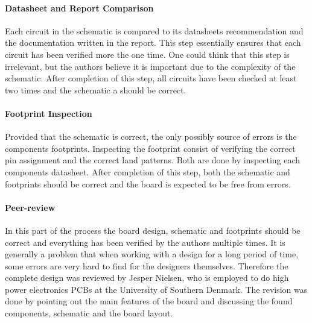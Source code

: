 \paragraph{Datasheet and Report Comparison}
Each circuit in the schematic is compared to its datasheets recommendation and the documentation written in the report. 
This step essentially ensures that each circuit has been verified more the one time. 
One could think that this step is irrelevant, but the authors believe it is important due to the complexity of the schematic.
After completion of this step, all circuits have been checked at least two times and the schematic a should be correct. 

\paragraph{Footprint Inspection}
Provided that the schematic is correct, the only possibly source of errors is the components footprints. 
Inspecting the footprint consist of verifying the correct pin assignment and the correct land patterns.
Both are done by inspecting each components datasheet. 
After completion of this step, both the schematic and footprints should be correct and the board is expected to be free from errors.

\paragraph{Peer-review}
In this part of the process the board design, schematic and footprints should be correct and everything has been verified by the authors multiple times.
It is generally a problem that when working with a design for a long period of time, some errors are very hard to find for the designers themselves. 
Therefore the complete design was reviewed by Jesper Nielsen, who is employed to do high power electronics PCBs at the University of Southern Denmark. 
The revision was done by pointing out the main features of the board and discussing the found components, schematic and the board layout.

